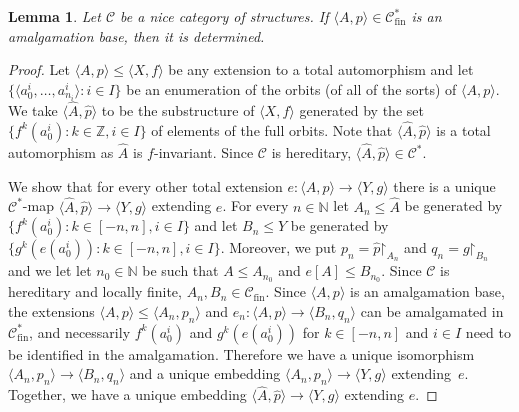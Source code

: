 \documentclass[10pt,a4paper]{article}
\newtheorem{lm}[tw]{Lemma}
\theoremstyle{definition}
\theoremstyle{remark}
\newcommand \set [1]{\{#1\}}
\newcommand \seq [1]{\langle #1 \rangle}
\newcommand \maps {\colon} %
\newcommand \im [1]{[#1]} %
\newcommand \restr [1] {\mathord{\upharpoonright}_{#1}}
\newcommand \N {\mathbb{N}}
\newcommand \Z {\mathbb{Z}}
\newcommand \C {\mathscr{C}}
\newcommand \fin {{\operatorname{fin}}}
\begin{document}
\begin{lm} \label{thm:amalgamation_base_determined}
    Let $\C$ be a nice category of structures.
    If $\seq{A, p} \in \C^*_\fin$ is an amalgamation base, then it is determined.
\end{lm}
\begin{proof}
    Let $\seq{A, p} \leq \seq{X, f}$ be any extension to a total automorphism and let $\set{\seq{a^i_0, \ldots, a^i_{n_i}}\colon i \in I}$ be an enumeration of the orbits (of all of the sorts) of $\seq{A, p}$.
    We take $\seq{\hat{A}, \hat{p}}$ to be the substructure of $\seq{X, f}$ generated by the set $\set{f^k(a^i_0): k \in \Z, i \in I}$ of elements of the full orbits.
    Note that $\seq{\hat{A}, \hat{p}}$ is a total automorphism as $\hat{A}$ is $f$-invariant.
    Since $\C$ is hereditary, $\seq{\hat{A}, \hat{p}} \in \C^*$.

    We show that for every other total extension $e\maps \seq{A, p} \to \seq{Y, g}$ there is a unique $\C^*$-map $\seq{\hat{A}, \hat{p}} \to \seq{Y, g}$ extending $e$.
    For every $n \in \N$ let $A_n \leq \hat{A}$ be generated by $\set{f^k(a^i_0): k \in [-n, n], i \in I}$ and let $B_n \leq Y$ be generated by $\set{g^k(e(a^i_0)): k \in [-n, n], i \in I}$.
    Moreover, we put $p_n = \hat{p}\restr{A_n}$ and $q_n = g\restr{B_n}$ and we let let $n_0 \in \N$ be such that $A \leq A_{n_0}$ and $e\im{A} \leq B_{n_0}$.
    Since $\C$ is hereditary and locally finite, $A_n, B_n \in \C_\fin$.
    Since $\seq{A, p}$ is an amalgamation base, the extensions $\seq{A, p} \leq \seq{A_n, p_n}$ and $e_n\maps \seq{A, p} \to \seq{B_n, q_n}$ can be amalgamated in $\C_\fin^*$, and necessarily $f^k(a^i_0)$ and $g^k(e(a^i_0))$ for $k \in [-n, n]$ and $i \in I$ need to be identified in the amalgamation. Therefore we have a unique isomorphism $\seq{A_n, p_n} \to \seq{B_n, q_n}$ and a unique embedding $\seq{A_n, p_n} \to \seq{Y, g}$ extending~$e$.
    Together, we have a unique embedding $\seq{\hat{A}, \hat{p}} \to \seq{Y, g}$ extending $e$.
\end{proof}
\end{document}
